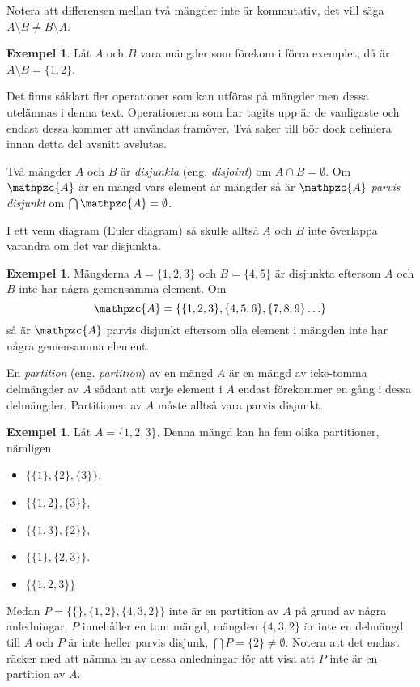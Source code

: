\documentclass{article}
\theoremstyle{definition}
\newtheorem{exmp}[thm]{Exempel}
\begin{document}
Notera att differensen mellan två mängder inte är kommutativ, det vill säga 
$A \setminus B \neq B \setminus A$.
\begin{exmp}
  Låt $A$ och $B$ vara mängder som förekom i förra exemplet, då är $A \setminus B
  = \{1, 2\}$.  
\end{exmp}
Det finns såklart fler operationer som kan utföras på mängder men 
\linebreak
dessa utelämnas i denna 
text. 
Operationerna som har tagits upp är de vanligaste och endast dessa kommer 
att användas framöver. Två saker till bör dock definiera innan detta del avsnitt avslutas. 

\begin{mydef}{}{}
  Två mängder $A$ och $B$ är \textit{disjunkta} (eng. \textit{disjoint}) om $A \cap B = \emptyset$. Om $\mathpzc{A}$ är 
  en mängd vars element är mängder så är $\mathpzc{A}$ \textit{parvis disjunkt} om $\bigcap \mathpzc{A} = 
  \emptyset$.
\end{mydef}
I ett venn diagram (Euler diagram) så skulle alltså $A$ och $B$ inte överlappa varandra
om det var disjunkta. 
\begin{exmp}
  Mängderna $A = \{1, 2, 3\}$ och $B = \{4, 5\}$ 
  är disjunkta eftersom $A$ och $B$ inte har några gemensamma element. 
  Om 
  \[\mathpzc{A} = \{\{1, 2, 3\}, \{4, 5, 6\}, \{7, 8, 9\}\ldots\}\] 
  så är $\mathpzc{A}$ parvis disjunkt eftersom alla element i mängden 
  inte har några gemensamma element. 
\end{exmp}

\begin{mydef}{}{}
  En \textit{partition} (eng. \textit{partition}) av en mängd $A$ är en mängd av icke-tomma delmängder av $A$ sådant att 
  varje element i $A$ endast förekommer en gång i dessa delmängder. 
  Partitionen av $A$ måste alltså vara parvis disjunkt.
\end{mydef}
\begin{exmp}
  Låt $A = \{1, 2, 3\}$. Denna mängd kan ha fem olika partitioner, nämligen
\begin{itemize}
  \item $\{\{1\}, \{2\}, \{3\}\}$,
  \item $\{ \{1, 2\}, \{3\} \}$,
  \item $\{ \{1, 3\}, \{2\} \}$,
  \item $\{ \{1\}, \{2, 3\} \}$.
  \item $\{ \{1, 2, 3\} \}$
\end{itemize}
Medan $ P = \{ \{\}, \{1, 2\}, \{4, 3, 2\} \}$ inte är en partition av $A$ på grund av några anledningar, $P$ innehåller en tom mängd, mängden $\{4, 3, 2\}$ är inte en delmängd till $A$
och $P$ är inte heller parvis disjunk, $\bigcap P = \{2\} \neq \emptyset$. Notera att det endast räcker med att nämna en av dessa anledningar för att visa att $P$ inte är en partition av $A$.
\end{exmp}
\end{document}
